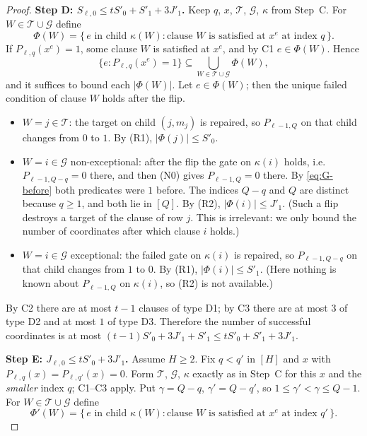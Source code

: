 \documentclass[11pt]{article}
\theoremstyle{definition}
\theoremstyle{remark}
\begin{document}
\begin{proof}
\medskip\noindent\textbf{Step D: \(S_{\ell,0}\le tS'_0+S'_1+3J'_1\).}
Keep \(q\), \(x\), \(\mathcal T\), \(\mathcal G\), \(\kappa\) from Step~C.
For \(W\in\mathcal T\cup\mathcal G\) define
\[
 \Phi(W)=\{\,e\text{ in child }\kappa(W):
 \text{clause \(W\) is satisfied at \(x^e\) at index \(q\)}\,\}.
\]
If \(P_{\ell,q}(x^e)=1\), some clause \(W\) is satisfied at \(x^e\), and by C1
\(e\in\Phi(W)\). Hence
\[
 \{e:P_{\ell,q}(x^e)=1\}\subseteq
 \bigcup_{W\in\mathcal T\cup\mathcal G}\Phi(W),
\]
and it suffices to bound each \(|\Phi(W)|\). Let \(e\in\Phi(W)\); then the
unique failed condition of clause \(W\) holds after the flip.
\begin{itemize}[leftmargin=2.2em]
\item[D1.] \(W=j\in\mathcal T\): the target on child \((j,m_j)\) is repaired,
 so \(P_{\ell-1,Q}\) on that child changes from \(0\) to \(1\). By (R1),
 \(|\Phi(j)|\le S'_0\).
\item[D2.] \(W=i\in\mathcal G\) non-exceptional: after the flip the gate on
 \(\kappa(i)\) holds, i.e.\ \(P_{\ell-1,Q-q}=0\) there, and then (N0) gives
 \(P_{\ell-1,Q}=0\) there. By \eqref{eq:G-before} both predicates were \(1\)
 before. The indices \(Q-q\) and \(Q\) are distinct because \(q\ge1\), and
 both lie in \([Q]\). By (R2), \(|\Phi(i)|\le J'_1\). (Such a flip destroys a
 target of the clause of row \(j\). This is irrelevant: we only bound the
 number of coordinates after which clause \(i\) holds.)
\item[D3.] \(W=i\in\mathcal G\) exceptional: the failed gate on \(\kappa(i)\)
 is repaired, so \(P_{\ell-1,Q-q}\) on that child changes from \(1\) to
 \(0\). By (R1), \(|\Phi(i)|\le S'_1\). (Here nothing is known about
 \(P_{\ell-1,Q}\) on \(\kappa(i)\), so (R2) is not available.)
\end{itemize}
By C2 there are at most \(t-1\) clauses of type D1; by C3 there are at most
\(3\) of type D2 and at most \(1\) of type D3. Therefore the number of
successful coordinates is at most
\((t-1)S'_0+3J'_1+S'_1\le tS'_0+S'_1+3J'_1\).

\medskip\noindent\textbf{Step E: \(J_{\ell,0}\le tS'_0+3J'_1\).}
Assume \(H\ge2\). Fix \(q<q'\) in \([H]\) and \(x\) with
\(P_{\ell,q}(x)=P_{\ell,q'}(x)=0\). Form \(\mathcal T\), \(\mathcal G\),
\(\kappa\) exactly as in Step~C for this \(x\) and the \emph{smaller} index
\(q\); C1--C3 apply. Put \(\gamma=Q-q\), \(\gamma'=Q-q'\), so
\(1\le\gamma'<\gamma\le Q-1\). For \(W\in\mathcal T\cup\mathcal G\) define
\[
 \Phi'(W)=\{\,e\text{ in child }\kappa(W):
 \text{clause \(W\) is satisfied at \(x^e\) at index \(q'\)}\,\}.
\]


\end{proof}
\end{document}
